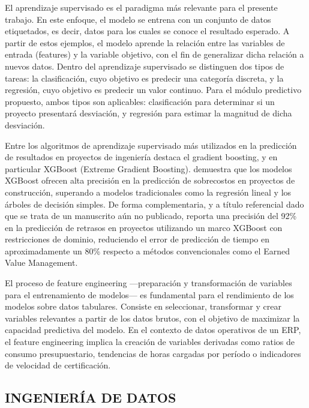 \documentclass{univalle-perfil}
\begin{document}
El aprendizaje supervisado es el paradigma más relevante para el presente trabajo. En este enfoque, el modelo se entrena con un conjunto de datos etiquetados, es decir, datos para los cuales se conoce el resultado esperado. A partir de estos ejemplos, el modelo aprende la relación entre las variables de entrada (features) y la variable objetivo, con el fin de generalizar dicha relación a nuevos datos. Dentro del aprendizaje supervisado se distinguen dos tipos de tareas: la clasificación, cuyo objetivo es predecir una categoría discreta, y la regresión, cuyo objetivo es predecir un valor continuo. Para el módulo predictivo propuesto, ambos tipos son aplicables: clasificación para determinar si un proyecto presentará desviación, y regresión para estimar la magnitud de dicha desviación.

Entre los algoritmos de aprendizaje supervisado más utilizados en la predicción de resultados en proyectos de ingeniería destaca el gradient boosting, y en particular XGBoost (Extreme Gradient Boosting). \textcite{XGBoostCostOverrun2026} demuestra que los modelos XGBoost ofrecen alta precisión en la predicción de sobrecostos en proyectos de construcción, superando a modelos tradicionales como la regresión lineal y los árboles de decisión simples. De forma complementaria, y a título referencial dado que se trata de un manuscrito aún no publicado, \textcite{DomainAwareXGBoost2025} reporta una precisión del 92\% en la predicción de retrasos en proyectos utilizando un marco XGBoost con restricciones de dominio, reduciendo el error de predicción de tiempo en aproximadamente un 80\% respecto a métodos convencionales como el Earned Value Management.

El proceso de feature engineering —preparación y transformación de variables para el entrenamiento de modelos— es fundamental para el rendimiento de los modelos sobre datos tabulares. Consiste en seleccionar, transformar y crear variables relevantes a partir de los datos brutos, con el objetivo de maximizar la capacidad predictiva del modelo. En el contexto de datos operativos de un ERP, el feature engineering implica la creación de variables derivadas como ratios de consumo presupuestario, tendencias de horas cargadas por período o indicadores de velocidad de certificación.

\subsection{INGENIERÍA DE DATOS}
\end{document}
